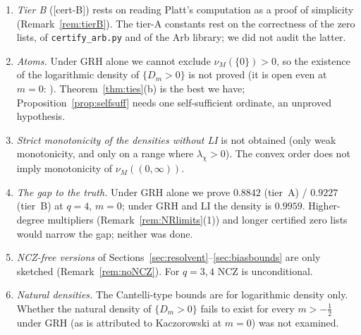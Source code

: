 \documentclass[11pt]{amsart}
\theoremstyle{definition}
\numberwithin{equation}{section}
\newcommand{\cN}{\mathcal N}          %
\newcommand{\cL}{\mathcal L}          %
\newcommand{\certB}{\textsf{[cert-B]}}
\begin{document}
\begin{enumerate}
ball-certified: $\Theta_1(p)>0$ for $p\le10^4$ (exact integers),
Lemma~\ref{lem:theta}(a) for $y\le2^{22}$ (Arb), the gap bounds for
$\cN$ up to $1.6\cdot10^8$ resp.\ $2.6\cdot10^7$ (Arb). The main text
($Y_1=10^{10}$) uses in addition Lemma~\ref{lem:theta}(a) on
$(2^{22},10^{10}]$ from the \texttt{long double} sieve, with margins
$0.089\sqrt y$ and $0.26\sqrt y$ against a worst-case accumulated
error of $0.21$; that range is not interval-certified (it would need
directed rounding in the C code or a much slower ball-arithmetic
sieve). In both variants the evaluations of the closed-form function
$\cL$ are ordinary double precision (margins $\ge0.018$ for the
positivity at $10^4$), and Corollary~\ref{cor:half} uses the grid
argument discussed in item~\ref{gap:margin} and, for $x>10^{20}$ and
$\chi_4$ only, Lemma~\ref{lem:theta}(b).
\item \emph{Tier B} (\certB) rests on reading Platt's computation
\cite{Pla16} as a proof of simplicity (Remark~\ref{rem:tierB}). The
tier-A constants rest on the correctness of the zero lists, of
\texttt{certify\_arb.py} and of the Arb library; we did not audit the
latter.
\item \emph{Atoms.} Under GRH alone we cannot exclude
$\nu_M(\{0\})>0$, so the existence of the logarithmic density of
$\{D_m>0\}$ is not proved (it is open even at $m=0$:
\cite[Remark~1.3]{Fio14}). Theorem~\ref{thm:ties}(b) is the best we
have; Proposition~\ref{prop:selfsuff} needs one self-sufficient
ordinate, an unproved hypothesis.
\item \emph{Strict monotonicity of the densities without LI} is not
obtained (only weak monotonicity, and only on a range where
$\lambda_\chi>0$). The convex order does not imply monotonicity of
$\nu_M((0,\infty))$.
\item \emph{The gap to the truth.} Under GRH alone we prove $0.8842$
(tier~A) / $0.9227$ (tier~B) at $q=4$, $m=0$; under GRH and LI the
density is $0.9959$. Higher-degree multipliers
(Remark~\ref{rem:NRlimits}(1)) and longer certified zero lists would
narrow the gap; neither was done.
\item \emph{NCZ-free versions} of
Sections~\ref{sec:resolvent}--\ref{sec:biasbounds} are only sketched
(Remark~\ref{rem:noNCZ}). For $q=3,4$ NCZ is unconditional.
\item \emph{Natural densities.} The Cantelli-type bounds are for
logarithmic density only. Whether the natural density of
$\{D_m>0\}$ fails to exist for every $m>-\tfrac12$ under GRH (as is
attributed to Kaczorowski at $m=0$) was not examined.

\end{enumerate}
\end{document}
